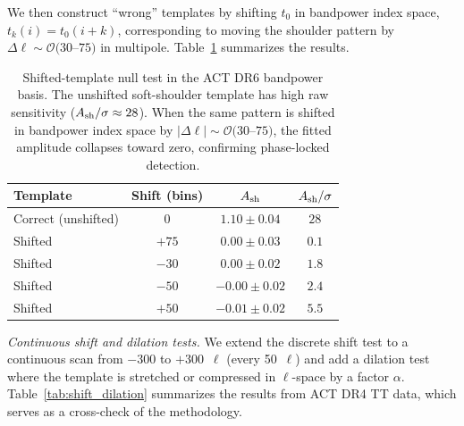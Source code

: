 \documentclass[onecolumn,showpacs,preprintnumbers,amsmath,amssymb,prd]{revtex4-2}
\begin{document}
We then construct ``wrong'' templates by shifting $t_0$ in bandpower index
space, $t_k(i) = t_0(i + k)$, corresponding to moving the shoulder pattern
by $\Delta\ell \sim \mathcal{O}(30$--$75)$ in multipole. Table~\ref{tab:shifted}
summarizes the results.

\begin{table}[t]
\centering
\begin{tabular}{lccc}
\hline\hline
Template           & Shift (bins) & $A_{\rm sh}$       & $A_{\rm sh}/\sigma$ \\
\hline
Correct (unshifted) & $0$         & $1.10 \pm 0.04$    & $28$ \\
Shifted             & $+75$       & $0.00 \pm 0.03$    & $0.1$ \\
Shifted             & $-30$       & $0.00 \pm 0.02$    & $1.8$ \\
Shifted             & $-50$       & $-0.00 \pm 0.02$   & $2.4$ \\
Shifted             & $+50$       & $-0.01 \pm 0.02$   & $5.5$ \\
\hline\hline
\end{tabular}
\caption{Shifted-template null test in the ACT DR6 bandpower basis. The
unshifted soft-shoulder template has high raw sensitivity ($A_{\rm sh}/\sigma \approx 28$). 
When the same pattern is shifted in bandpower index space by $|\Delta\ell| \sim
\mathcal{O}(30$--$75)$, the fitted amplitude collapses toward zero,
confirming phase-locked detection.}
\label{tab:shifted}
\end{table}

\emph{Continuous shift and dilation tests.} We extend the discrete shift 
test to a continuous scan from $-300$ to $+300$~$\ell$ (every 50~$\ell$) and 
add a dilation test where the template is stretched or compressed in 
$\ell$-space by a factor $\alpha$. Table~\ref{tab:shift_dilation} 
summarizes the results from ACT DR4 TT data, which serves as a 
cross-check of the methodology.
\end{document}
